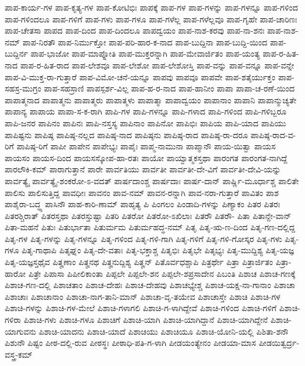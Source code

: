 {ಪಾಪ-ಕಾರ್ಯ-ಗಳ
ಪಾಪ-ಕೃತ್ಯ-ಗಳ
ಪಾಪ-ಕೋಟಿಭಿಃ
ಪಾಪಕ್ಕೆ
ಪಾಪ-ಗಳ
ಪಾಪ-ಗಳನ್ನು
ಪಾಪ-ಗಳನ್ನೂ
ಪಾಪ-ಗಳಿಂದ
ಪಾಪ-ಗಳಿಂದಲೂ
ಪಾಪ-ಗಳಿಗೆ
ಪಾಪ-ಗಳು
ಪಾಪ-ಗಳೂ
ಪಾಪ-ಗಳೆಲ್ಲ
ಪಾಪ-ಗಳೆಲ್ಲವೂ
ಪಾಪ-ಗೃಹೇ
ಪಾಪ-ಚಾರಿಣಃ
ಪಾಪ-ಚೇತಸಾ
ಪಾಪದ
ಪಾಪ-ದಿಂದ
ಪಾಪ-ದಿಂದಲೂ
ಪಾಪದ್ವಯಂ
ಪಾಪ-ನಾಶ-ಕರವು
ಪಾಪ-ನಾ-ಶನಃ
ಪಾಪ-ನಾಶ-ನಮ್
ಪಾಪ-ನಿರತೌ
ಪಾಪ-ನಿರ್ಮುಕ್ತೋ
ಪಾಪ-ಪರಿ-ಹಾರ-ಕ-ನಾದ
ಪಾಪ-ಬುದ್ದಿನಾ
ಪಾಪ-ಬುದ್ದಿ-ಯಿಂದ
ಪಾಪ-ಬುದ್ದಿರ್ನ
ಪಾಪ-ಭಾಜೋ
ಪಾಪ-ಮಾಪ್ನೋತಿ
ಪಾಪ-ಮುಕ್ತರನ್ನಾಗಿ
ಪಾಪ-ಮೇವಾರ್ಜಿತಂ
ಪಾಪ-ಯಂತ್ಯ
ಪಾಪ-ರ-ಹಿತ-ನಾದ
ಪಾಪ-ರ-ಹಿತ-ರಾದ
ಪಾಪ-ಲೇಶವೂ
ಪಾಪ-ಲೇಶೋ
ಪಾಪ-ಲೇಶೋಸ್ತಿ
ಪಾಪ-ವನ್ನು
ಪಾಪ-ವನ್ನೂ
ಪಾಪ-ವನ್ನೇ
ಪಾಪ-ವಿ-ಮುಕ್ತ-ರಾ-ಗುತ್ತಾರೆ
ಪಾಪ-ವಿಮೋ-ಚನೆ-ಯನ್ನೂ
ಪಾಪವು
ಪಾಪವೂ
ಪಾಪವೇ
ಪಾಪ-ಶತೈರ್ಯುಕ್ತಂ
ಪಾಪ-ಸಹಸ್ರ-ಮುಗ್ರಂ
ಪಾಪ-ಸಹಸ್ರಾಣಿ
ಪಾಪಸ್ಪರ್ಶ-ವಿಲ್ಲ
ಪಾಪ-ಹ-ರ-ನಾದ
ಪಾಪ-ಹಾನೀಂ
ಪಾಪಾ
ಪಾಪಾ-ಚ-ರಣೆ-ಯಿಂದ
ಪಾಪಾತ್ಮನಾದ
ಪಾಪಾತ್ಮನು
ಪಾಪಾತ್ಮರು
ಪಾಪಾತ್ಮಳು
ಪಾಪಾತ್ಮಾ
ಪಾಪಾದ್ವಯಂ
ಪಾಪಾನಾಂ
ಪಾಪಾನಿ
ಪಾಪಾನ್ಮುಚ್ಯತೇ
ಪಾಪಾನ್ಯ
ಪಾಪಾಯ
ಪಾಪಾ-ಸ-ಕ-ರಾಗಿ
ಪಾಪಿ-ಗಳ
ಪಾಪಿ-ಗಳನ್ನೂ
ಪಾಪಿ-ಗಳಾದ
ಪಾಪಿ-ಗಳಿಂದ
ಪಾಪಿ-ಗಳಿಬ್ಬರೂ
ಪಾಪಿ-ಜನರ
ಪಾಪಿನಂ
ಪಾಪಿನಃ
ಪಾಪಿ-ನಸ್ತಸ್ಯ
ಪಾಪಿನಾಂ
ಪಾಪಿನೋ
ಪಾಪಿಭಿಃ
ಪಾಪಿಯ
ಪಾಪಿ-ಯಾದ
ಪಾಪಿಯು
ಪಾಪಿಷ್ಟನು
ಪಾಪಿಷ್ಠ
ಪಾಪಿಷ್ಠ-ನಲ್ಲದ
ಪಾಪಿಷ್ಠ-ನಾದ
ಪಾಪಿಷ್ಠನು
ಪಾಪಿಷ್ಠ-ರಾದ
ಪಾಪಿಷ್ಠ-ರಾ-ದರೂ
ಪಾಪಿಷ್ಠ-ರಾದ-ವ-ರಿಗೆ
ಪಾಪಿಷ್ಠ-ರಿಗೆ
ಪಾಪೀ
ಪಾಪೇನ
ಪಾಪೇಭ್ಯಃ
ಪಾಪೈಃ
ಪಾಪ್ಮ-ನಾಮುನಾ
ಪಾಪ್ಮಾನೌ
ಪಾಯ-ಯಿತ್ವಾ
ಪಾಯಸ
ಪಾಯಸಂ
ಪಾಯಸ-ದಿಂದ
ಪಾಯಸಸ್ಕೋಪ-ಹಾ-ರತಃ
ಪಾಯೋ
ಪಾಯ್ವಾತ್ಮಕಸ್ತಥಾ
ಪಾರಂಗತ
ಪಾರಂಗತ-ನಾಗಿದ್ದೆ
ಪಾರಲೌಕಿ-ಕಮ್
ಪಾರಾಗುತ್ತಾನೆ
ಪಾರೇ
ಪಾರ್ವತಿಯು
ಪಾರ್ವತೀ
ಪಾರ್ವತೀ-ದೇ-ವಿಗೆ
ಪಾರ್ವತೀ-ದೇವಿ-ಯನ್ನು
ಪಾರ್ವತ್ಯೈ
ಪಾರ್ವತ್ಯೈ-ಶಂಕರೋ-ಽ-ವದತ್
ಪಾರ್ಷದಾಂಶ್ಚ
ಪಾರ್ಷದಾಃ
ಪಾರ್ಷ-ದಾನ್
ಪಾರ್ಷ್ಣಿ-ಮೂರ್ಧಾಶ್ಚ
ಪಾಲಿತೇ
ಪಾಲಿಸು
ಪಾಲಿಸುತ್ತಿದ್ದ
ಪಾವಧೀಃ
ಪಾವನಂ
ಪಾವ-ನಮ್
ಪಾವನ-ರನ್ನಾಗಿ
ಪಾವ-ನರಾ-ಗುತ್ತಾರೆ
ಪಾವಿತಂ
ಪಾಶ
ಪಾಶೈರಾ-ಬದ್ಧ್ಯ
ಪಾಸಿನೌ
ಪಾಹ-ಕಾರಿ-ಣಾಮ್
ಪಾಹೃತ್ಯ
ಪಿ
ಪಿಂಗಲಂ
ಪಿಂಡಾದಿ-ಗಳನ್ನು
ಪಿಣ್ಯಾಕಂ
ಪಿತರ
ಪಿತರಃ
ಪಿತರಶ್ಚಿರಾತ್
ಪಿತರಸ್ತಥಾ
ಪಿತರಸ್ತುಷ್ಟಾ
ಪಿತರಿ
ಪಿತರೋ
ಪಿತರೋ-ಽಖಿಲಾಃ
ಪಿತರೌ
ಪಿತರೌ-
ಪಿತಾ
ಪಿತಾನ್ದೇ-ವಾನ್
ಪಿತಾ-ಮಹನೆ
ಪಿತುಃ
ಪಿತುರ್ಭಾತಾ
ಪಿತುರ್ಮಮ
ಪಿತುರ್ಮಹದ್ಧ-ನಮ್
ಪಿತೃ
ಪಿತೃ-ಋ-ಣ-ದಿಂದ
ಪಿತೃ-ಗಣ-ದಲ್ಲಿದ್ದ
ಪಿತೃ-ಗಳ
ಪಿತೃ-ಗಳನ್ನು
ಪಿತೃ-ಗಳನ್ನೂ
ಪಿತೃ-ಗಳಿಂದ
ಪಿತೃ-ಗಳಿ-ಗಾಗಿ
ಪಿತೃ-ಗಳಿಗೆ
ಪಿತೃ-ಗಳಿ-ಗೋಸ್ಕರ
ಪಿತೃ-ಗಳು
ಪಿತೃ-ಗಳೂ
ಪಿತೃ-ಗಾಥಾಪಿ
ಪಿತೃಘ್ನಂ
ಪಿತೃ-ದೇ-ವತಾಃ
ಪಿತೃ-ಭಕ್ತಾಶ್ಚ
ಪಿತೃಭಿಃ
ಪಿತೃಭೇ
ಪಿತೃಭ್ಯಃ
ಪಿತೃ-ಮುದ್ದಿಶ್ಯ
ಪಿತೃ-ಯಜ್ಞ
ಪಿತೃ-ಯಜ್ಞಸ್ತಥೈವ
ಪಿತೄಣಾಂ
ಪಿತೄನಥ
ಪಿತೄನುದ್ದಿಶ್ಯ
ಪಿತೄನ್
ಪಿತೊರ್ವಧಶ್ಚಾಪಿ
ಪಿತ್ರರ್ಥೇ
ಪಿತ್ರಾ
ಪಿತ್ರಾರ್ಜಿತಂ
ಪಿತ್ರಾ-ಹಾರೋ
ಪಿತ್ರೇ
ಪಿಪಾಸಾ
ಪಿಪೀಲಿಕಾಂತಾ
ಪಿಪ್ಪಲೇ
ಪಿಪ್ಪಲೇ-ಶನ
ಪಿಪ್ಪಲೇ-ಶಪ್ರಸಾದೇನ
ಪಿಬಂತಿ
ಪಿಶಾಚ
ಪಿಶಾಚ-ಗಣಕ್ಕೆ
ಪಿಶಾಚ-ಗಣ-ದಲ್ಲಿ
ಪಿಶಾಚತಾಂ
ಪಿಶಾಚ-ದೇಹಃ
ಪಿಶಾಚ-ದೇಹವು
ಪಿಶಾಚಭ್ಯೇಶ್ಚ
ಪಿಶಾಚ-ಯಕ್ಷ-ನಾ-ಗಾನಾಂ
ಪಿಶಾಚಾ
ಪಿಶಾಚಾಃ
ಪಿಶಾಚಾನಾಂ
ಪಿಶಾಚಾ-ನಾಗ-ತಾನಿ-ಮಾನ್
ಪಿಶಾಚಾ-ವೃ-ತಯೇವ
ಪಿಶಾಚಾಸ್ತೇ
ಪಿಶಾಚಿ
ಪಿಶಾಚಿ-ಗಳ
ಪಿಶಾಚಿ-ಗಳನ್ನು
ಪಿಶಾಚಿ-ಗಳ-ಮೇಲೆ
ಪಿಶಾಚಿ-ಗಳಾಗಲಿ
ಪಿಶಾಚಿ-ಗ-ಳಾಗಿದ್ದೇವೆ
ಪಿಶಾಚಿ-ಗಳಿಂದ
ಪಿಶಾಚಿ-ಗಳಿಗೆ
ಪಿಶಾಚಿ-ಗಳಿರಾ
ಪಿಶಾಚಿ-ಗಳು
ಪಿಶಾಚಿ-ಗಳೂ
ಪಿಶಾಚಿಗೆ
ಪಿಶಾಚಿ-ಯಾಗಿ
ಪಿಶಾಚಿ-ಯಾಗಿದ್ದಾನೆ
ಪಿಶಾಚಿ-ಯಾಗಿದ್ದೇನೆ
ಪಿಶಾಚಿ-ಯಾಗುವನು
ಪಿಶಾಚಿ-ಯಾದನು
ಪಿಶಾಚಿ-ಯಾದೆ
ಪಿಶಾಚಿಯು
ಪಿಶಾಚಿಯೂ
ಪಿಶಾಚಿ-ಯೋನಿ-ಯಲ್ಲಿ
ಪಿಶಿತಾ-ಶನೌ
ಪಿಶುನೌ
ಪಿಷ್ಟಂ
ಪೀಠ-ದಲ್ಲಿ-ರುವ
ಪೀಠಸ್ಥಃ
ಪೀಠಾಧಿ-ಪತಿ-ಗ-ಳಾಗಿ
ಪೀಡಯಂತ್ಯೇನಂ
ಪೀಡಯಾ-ಮಾಸ
ಪೀಡಯಿತ್ವರ್ದ್ರ-ವಸ್ತ್ರ-ಕಮ್
}

